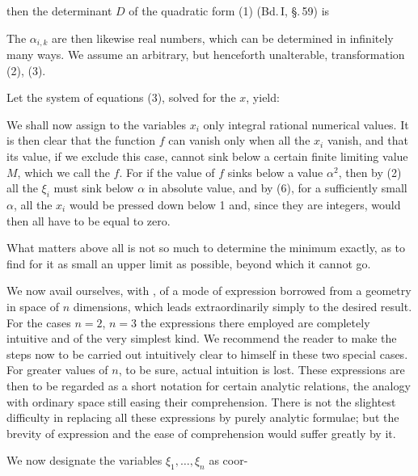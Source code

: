 then the determinant $D$ of the quadratic form (1) (Bd.\,I, \S.\,59) is

The $\alpha_{i,k}$ are then likewise real numbers, which can be determined in infinitely many ways. We assume an arbitrary, but henceforth unalterable, transformation (2), (3).

Let the system of equations (3), solved for the $x$, yield:

We shall now assign to the variables $x_i$ only integral rational numerical values. It is then clear that the function $f$ can vanish only when all the $x_i$ vanish, and that its value, if we exclude this case, cannot sink below a certain finite limiting value $M$, which we call the  $f$. For if the value of $f$ sinks below a value $\alpha^2$, then by (2) all the $\xi_i$ must sink below $\alpha$ in absolute value, and by (6), for a sufficiently small $\alpha$, all the $x_i$ would be pressed down below 1 and, since they are integers, would then all have to be equal to zero.

What matters above all is not so much to determine the minimum exactly, as to find for it as small an upper limit as possible, beyond which it cannot go.

We now avail ourselves, with , of a mode of expression borrowed from a geometry in space of $n$ dimensions, which leads extraordinarily simply to the desired result. For the cases $n=2$, $n=3$ the expressions there employed are completely intuitive and of the very simplest kind. We recommend the reader to make the steps now to be carried out intuitively clear to himself in these two special cases. For greater values of $n$, to be sure, actual intuition is lost. These expressions are then to be regarded as a short notation for certain analytic relations, the analogy with ordinary space still easing their comprehension. There is not the slightest difficulty in replacing all these expressions by purely analytic formulae; but the brevity of expression and the ease of comprehension would suffer greatly by it.

We now designate the variables $\xi_1, \ldots, \xi_n$ as coor-
